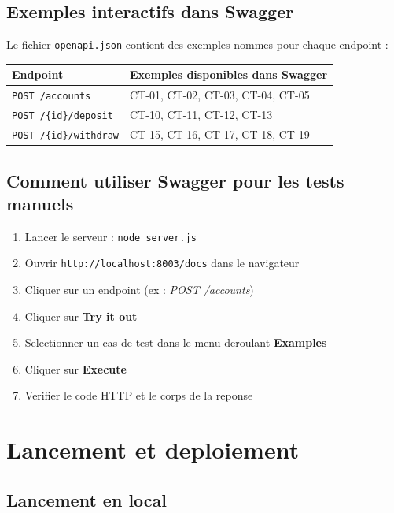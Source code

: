 \documentclass[12pt,a4paper]{article}
\begin{document}
\subsection{Exemples interactifs dans Swagger}

Le fichier \texttt{openapi.json} contient des exemples nommes pour chaque endpoint :

\begin{center}
\begin{tabular}{ll}
\toprule
\textbf{Endpoint} & \textbf{Exemples disponibles dans Swagger} \\
\midrule
\texttt{POST /accounts} & CT-01, CT-02, CT-03, CT-04, CT-05 \\
\texttt{POST /\{id\}/deposit} & CT-10, CT-11, CT-12, CT-13 \\
\texttt{POST /\{id\}/withdraw} & CT-15, CT-16, CT-17, CT-18, CT-19 \\
\bottomrule
\end{tabular}
\end{center}

\subsection{Comment utiliser Swagger pour les tests manuels}

\begin{enumerate}
  \item Lancer le serveur : \texttt{node server.js}
  \item Ouvrir \texttt{http://localhost:8003/docs} dans le navigateur
  \item Cliquer sur un endpoint (ex : \textit{POST /accounts})
  \item Cliquer sur \textbf{Try it out}
  \item Selectionner un cas de test dans le menu deroulant \textbf{Examples}
  \item Cliquer sur \textbf{Execute}
  \item Verifier le code HTTP et le corps de la reponse
\end{enumerate}

\section{Lancement et deploiement}

\subsection{Lancement en local}
\end{document}
